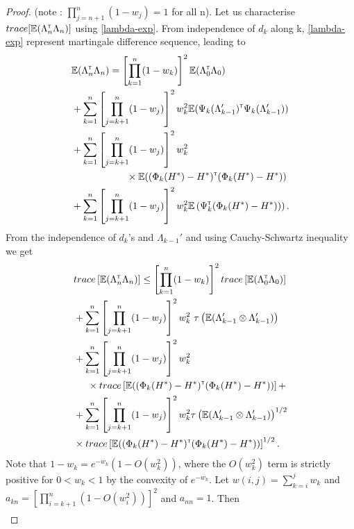 \begin{proof}
 (note : $\prod_{j=n+1}^n (1-w_j) = 1$ for all n).
 Let us  characterise $trace[\mathbb{E}(\Lambda_n^\mathsf{\scriptscriptstyle T} \Lambda_n)]$ using \eqref{lambda-exp}. From independence of $d_k$ along k, \eqref{lambda-exp} represent martingale difference sequence, leading to 
 \begin{align}\label{eq:exp-lambda2}
 & \mathbb{E} (\Lambda_n ^\mathsf{\scriptscriptstyle T} \Lambda_n) =  \left[ \prod_{k=1}^n (1-w_k) \right]^2 \mathbb{E} (\Lambda_0 ^\mathsf{\scriptscriptstyle T} \Lambda_0)  \nonumber\\ &+ \sum_{k=1}^n \left[\prod_{j=k+1}^n (1-w_j)\right]^2 w_k^2   \mathbb{E} (\Psi_k(\Lambda_{k-1}') ^\mathsf{\scriptscriptstyle T} \Psi_k(\Lambda_{k-1}'))  \nonumber\\ &+ \sum_{k=1}^n \left[\prod_{j=k+1}^n (1-w_j)\right]^2 w_k^2  \nonumber\\& \hspace{2cm} \times \mathbb{E} ((\Phi_k(H^*) - H^*) ^\mathsf{\scriptscriptstyle T}  (\Phi_k(H^*) - H^*)) \nonumber\\&+\sum_{k=1}^n \left[\prod_{j=k+1}^n (1-w_j)\right]^2 w_k^2 \mathbb{E}\left(\Psi_k ^\mathsf{\scriptscriptstyle T} (\Phi_k(H^*) - H^*))\right).
 \end{align}
 From the independence of $d_k$'s and $\Lambda_{k-1}'$ and using Cauchy-Schwartz inequality we get 
 \begin{align}\label{eq:trace}
 & trace \left[\mathbb{E} (\Lambda_n ^\mathsf{\scriptscriptstyle T} \Lambda_n)\right] \leq \left[ \prod_{k=1}^n (1-w_k) \right]^2 trace \left[\mathbb{E} (\Lambda_0 ^\mathsf{\scriptscriptstyle T} \Lambda_0)\right]  \nonumber\\ &+ \sum_{k=1}^n \left[\prod_{j=k+1}^n (1-w_j)\right]^2 w_k^2  \,\,\tau\left(\mathbb{E} (\Lambda_{k-1}' \otimes \Lambda_{k-1}')\right)  \nonumber\\ &+ \sum_{k=1}^n \left[\prod_{j=k+1}^n (1-w_j)\right]^2 w_k^2  \nonumber\\&  \hspace{0.5cm}\times trace\left[\mathbb{E} ((\Phi_k(H^*) - H^*) ^\mathsf{\scriptscriptstyle T}  (\Phi_k(H^*) - H^*))\right] + \nonumber\\ &+ \sum_{k=1}^n \left[\prod_{j=k+1}^n (1-w_j)\right]^2 w_k^2   \tau\left(\mathbb{E} (\Lambda_{k-1}' \otimes \Lambda_{k-1}')\right)^{1/2} \nonumber\\&  \times trace\left[\mathbb{E} ((\Phi_k(H^*) - H^*) ^\mathsf{\scriptscriptstyle T}  (\Phi_k(H^*) - H^*))\right]^{1/2}.
 \end{align}
Note that $1-w_k = e^{-w_k}(1-O(w_k^2))$, where the $O(w_k^2)$ term is strictly positive for $0 < w_k <1$ by the convexity of $e^{-w_k}$. Let $w(i,j) = \sum_{k=i}^j w_k$ and $a_{kn} = \left[\prod_{i=k+1}^n (1- O(w_i^2))\right]^2$ and $a_{nn} = 1$. Then
\begin{align}\label{eq:wij}

\end{align}
\end{proof}
